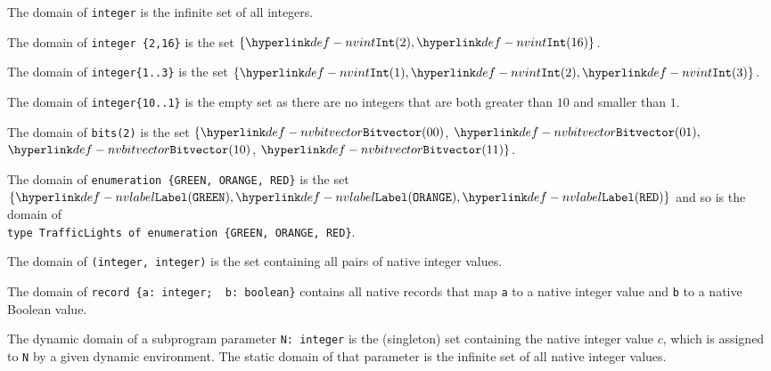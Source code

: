 \begin{mathpar}
\end{mathpar}

The domain of \texttt{integer} is the infinite set of all integers.

The domain of \verb|integer {2,16}| is the set $\{\nvint(2), \nvint(16)\}$.

The domain of \verb|integer{1..3}| is the set $\{\nvint(1), \nvint(2), \nvint(3)\}$.

The domain of \verb|integer{10..1}| is the empty set as there are no integers that are
both greater than $10$ and smaller than $1$.

The domain of \texttt{bits(2)} is the set $\{\nvbitvector(00)$, $\nvbitvector(01),$
$\nvbitvector(10)$, $\nvbitvector(11)\}$.

The domain of \verb|enumeration {GREEN, ORANGE, RED}| is the set \\
$\{\nvlabel(\texttt{GREEN}), \nvlabel(\texttt{ORANGE}), \nvlabel(\texttt{RED})\}$ and so is the domain
of \\
\verb|type TrafficLights of enumeration {GREEN, ORANGE, RED}|.

The domain of \texttt{(integer, integer)} is the set containing all pairs of native integer values.

The domain of \verb|record {a: integer;  b: boolean}| contains all native records
that map \texttt{a} to a native integer value and \texttt{b} to a native Boolean value.

The dynamic domain of a subprogram parameter \texttt{N: integer} is the (singleton) set containing
the native integer value $c$,
which is assigned to \texttt{N} by a given dynamic environment. The static domain of that parameter
is the infinite set of all native integer values.

  
    
    
   
